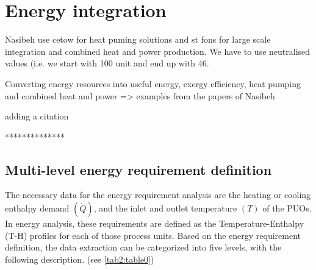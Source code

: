 \section{Energy integration}


Nasibeh use cetow for heat puming solutions and st fons for large scale integration and combined heat and power production. We have to use neutralised values (i.e. we start with 100 unit and end up with 46.


Converting energy resources into useful energy, exergy efficiency, heat pumping and combined heat and power => examples from the papers of Nasibeh

adding a citation \cite{Pouransari_2014}



**************
\subsection{Multi-level energy requirement definition}
\label{subsec:Multi-layer}
The necessary data for the energy requirement analysis are the heating or cooling enthalpy demand $(\dot{Q})$, and the inlet and outlet temperature $ (T) $ of the PUOs. In energy analysis, these requirements are defined as the Temperature-Enthalpy (T-H) profiles for each of those process units. Based on the energy requirement definition, the data extraction can be categorized into five levels, with the following description. (see \cref{tab2:table0})

